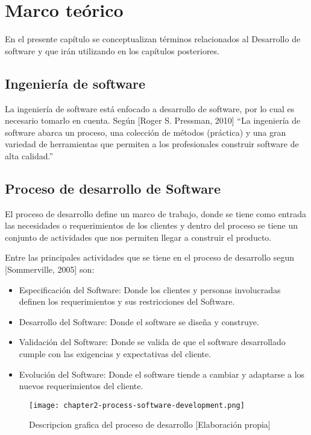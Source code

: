 \chapter{Marco teórico}
\noindent En el presente capítulo se conceptualizan términos relacionados al Desarrollo de software y que irán utilizando en los capítulos posteriores.

\section{Ingeniería de software}
\noindent La ingeniería de software está enfocado a desarrollo de software, por lo cual es necesario tomarlo en cuenta. Según [Roger S. Pressman, 2010] “La ingeniería de software abarca un proceso, una colección de métodos (práctica) y una gran variedad de herramientas que permiten a los profesionales construir software de alta calidad.”


\section{Proceso de desarrollo de Software}
\noindent El proceso de desarrollo define un marco de trabajo, donde se tiene como entrada las necesidades o requerimientos de los clientes y dentro del proceso se tiene un conjunto de actividades que nos permiten llegar a construir el producto.

\noindent Entre las principales actividades que se tiene en el proceso de desarrollo segun [Sommerville, 2005] son:
\begin{itemize}
  \item Especificación del Software: Donde los clientes y personas involucradas definen los requerimientos y sus restricciones del  Software.
  \item Desarrollo del Software: Donde el software se diseña y construye.
  \item Validación del Software: Donde se valida de que el software desarrollado cumple con las exigencias y expectativas del cliente.
  \item Evolución del Software: Donde el software tiende a cambiar y adaptarse a los nuevos requerimientos del cliente.
\end{itemize}

\begin{figure}[ht]
  \centering
  \texttt{[image: chapter2-process-software-development.png]}
  \caption{Descripcion grafica del proceso de desarrollo [Elaboración propia]}  
\end{figure}

